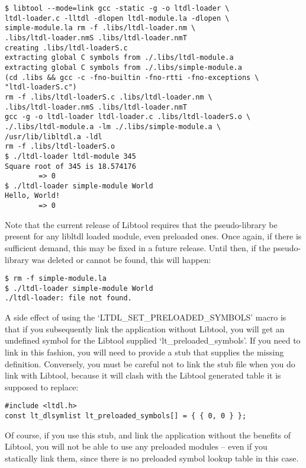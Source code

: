 \begin{Verbatim}[frame=single]
$ libtool --mode=link gcc -static -g -o ltdl-loader \
ltdl-loader.c -lltdl -dlopen ltdl-module.la -dlopen \
simple-module.la rm -f .libs/ltdl-loader.nm \
.libs/ltdl-loader.nmS .libs/ltdl-loader.nmT
creating .libs/ltdl-loaderS.c
extracting global C symbols from ./.libs/ltdl-module.a
extracting global C symbols from ./.libs/simple-module.a
(cd .libs && gcc -c -fno-builtin -fno-rtti -fno-exceptions \
"ltdl-loaderS.c")
rm -f .libs/ltdl-loaderS.c .libs/ltdl-loader.nm \
.libs/ltdl-loader.nmS .libs/ltdl-loader.nmT
gcc -g -o ltdl-loader ltdl-loader.c .libs/ltdl-loaderS.o \
./.libs/ltdl-module.a -lm ./.libs/simple-module.a \
/usr/lib/libltdl.a -ldl
rm -f .libs/ltdl-loaderS.o
$ ./ltdl-loader ltdl-module 345
Square root of 345 is 18.574176
        => 0
$ ./ltdl-loader simple-module World
Hello, World!
        => 0
\end{Verbatim}

Note that the current release of Libtool requires that the pseudo-library be present for any libltdl loaded module, even preloaded ones. Once again, if there is sufficient demand, this may be fixed in a future release. Until then, if the pseudo-library was deleted or cannot be found, this will happen:

\begin{Verbatim}[frame=single]
$ rm -f simple-module.la
$ ./ltdl-loader simple-module World
./ltdl-loader: file not found.
\end{Verbatim}

A side effect of using the `LTDL\_{}SET\_{}PRELOADED\_{}SYMBOLS' macro is that if you subsequently link the application without Libtool, you will get an undefined symbol for the Libtool supplied `lt\_{}preloaded\_{}symbols'. If you need to link in this fashion, you will need to provide a stub that supplies the missing definition. Conversely, you must be careful not to link the stub file when you do link with Libtool, because it will clash with the Libtool generated table it is supposed to replace:

\begin{Verbatim}[frame=single]
#include <ltdl.h>
const lt_dlsymlist lt_preloaded_symbols[] = { { 0, 0 } };
\end{Verbatim}

Of course, if you use this stub, and link the application without the benefits of Libtool, you will not be able to use any preloaded modules -- even if you statically link them, since there is no preloaded symbol lookup table in this case.

